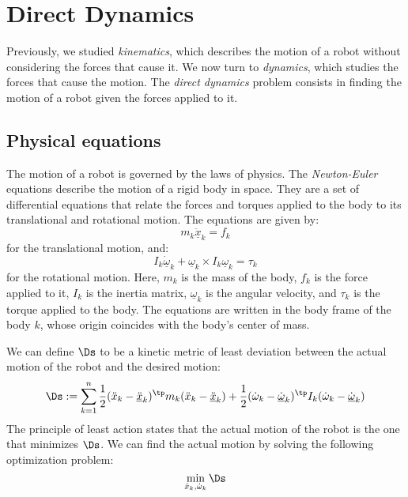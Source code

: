 \section{Direct Dynamics}
Previously, we studied \emph{kinematics}, which describes the motion of a robot without considering the forces that cause it. We now turn to \emph{dynamics}, which studies the forces that cause the motion. The \emph{direct dynamics} problem consists in finding the motion of a robot given the forces applied to it.

\subsection{Physical equations}
The motion of a robot is governed by the laws of physics. The \emph{Newton-Euler} equations describe the motion of a rigid body in space. They are a set of differential equations that relate the forces and torques applied to the body to its translational and rotational motion. The equations are given by:
\begin{equation}
    \tag{Newton's equation}
    m_k\underline{\ddot{x}}_k = f_k
\end{equation}
for the translational motion, and:
\begin{equation}
    \tag{Euler's equation}
    I_k\underline{\dot{\omega}}_k + \underline{\omega}_k\times I_k\underline{\omega}_k = \tau_k
\end{equation}
for the rotational motion. Here, $m_k$ is the mass of the body, $f_k$ is the force applied to it, $I_k$ is the inertia matrix, $\underline{\omega}_k$ is the angular velocity, and $\tau_k$ is the torque applied to the body. The equations are written in the body frame of the body $k$, whose origin coincides with the body's center of mass.

We can define $\Ds$ to be a kinetic metric of least deviation between the actual motion of the robot and the desired motion:
\begin{equation}
    \Ds := \sum_{k=1}^n \frac{1}{2}(\ddot{x}_k - \underline{\ddot{x}}_k)^\tp m_k (\ddot{x}_k - \underline{\ddot{x}}_k) + \frac{1}{2}(\dot{\omega}_k - \underline{\dot{\omega}}_k)^\tp I_k (\dot{\omega}_k - \underline{\dot{\omega}}_k)
\end{equation}
The principle of least action states that the actual motion of the robot is the one that minimizes $\Ds$. We can find the actual motion by solving the following optimization problem:
\begin{equation}
    \min_{\ddot{x}_k, \dot{\omega}_k} \Ds
\end{equation}

